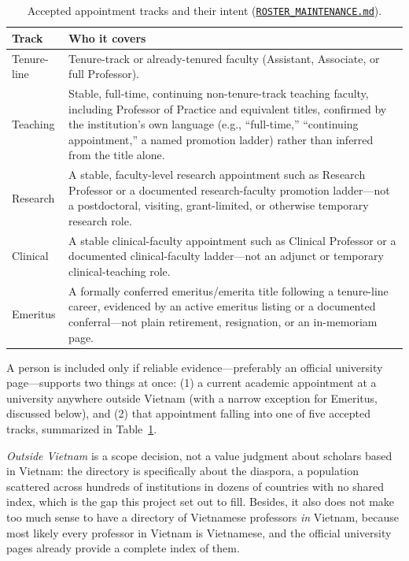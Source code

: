 \documentclass[11pt]{article}
\newcommand{\code}[1]{\texttt{\small #1}}
\newcommand{\ghrepo}{https://github.com/dynaroars/vietprofs}
\newcommand{\codelinkd}[2]{\href{\ghrepo/blob/main/#1}{\code{#2}}}
\begin{document}
\begin{table}
\centering
\caption{Accepted appointment tracks and their intent (\codelinkd{ROSTER_MAINTENANCE.md}{ROSTER\_MAINTENANCE.md}).}
\label{tab:tracks}
\small
\begin{tabularx}{\linewidth}{@{}lX@{}}
\toprule
Track & Who it covers \\
\midrule
Tenure-line & Tenure-track or already-tenured faculty (Assistant, Associate, or full Professor). \\
Teaching & Stable, full-time, continuing non-tenure-track teaching faculty, including Professor of
Practice and equivalent titles, confirmed by the institution's own language (e.g., ``full-time,''
``continuing appointment,'' a named promotion ladder) rather than inferred from the title alone. \\
Research & A stable, faculty-level research appointment such as Research Professor or a documented
research-faculty promotion ladder---not a postdoctoral, visiting, grant-limited, or otherwise
temporary research role. \\
Clinical & A stable clinical-faculty appointment such as Clinical Professor or a documented
clinical-faculty ladder---not an adjunct or temporary clinical-teaching role. \\
Emeritus & A formally conferred emeritus/emerita title following a tenure-line career, evidenced by
an active emeritus listing or a documented conferral---not plain retirement, resignation, or an
in-memoriam page. \\
\bottomrule
\end{tabularx}
\end{table}

A person is included only if reliable evidence---preferably an official university page---supports two things at once: (1) a current academic appointment at a university anywhere outside Vietnam (with a narrow exception for Emeritus, discussed below), and (2) that appointment falling into one of five accepted tracks, summarized in Table~\ref{tab:tracks}.

\emph{Outside Vietnam} is a scope decision, not a value judgment about scholars based in Vietnam: the directory is specifically about the diaspora, a population scattered across hundreds of institutions in dozens of countries with no shared index, which is the gap this project set out to fill. Besides, it also does not make too much sense to have a directory of Vietnamese professors \emph{in} Vietnam, because most likely every professor in Vietnam is Vietnamese, and the official university pages already provide a complete index of them.
\end{document}

